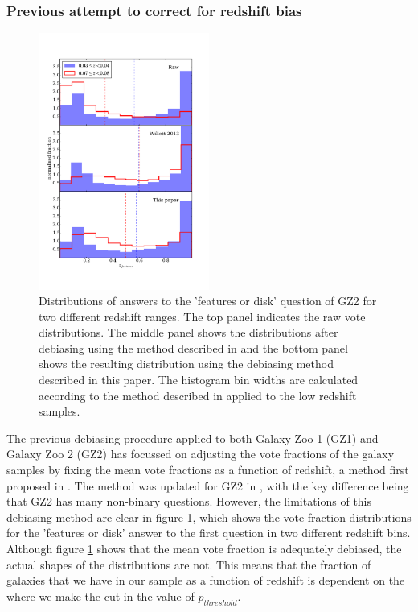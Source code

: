 \documentclass[useAMS,usenatbib]{mn2e}
\begin{document}
\subsubsection{Previous attempt to correct for redshift bias}
\label{sec:previous_method}
\begin{figure}
		\centering
		
        \includegraphics[width=0.5\textwidth]{Bias_imgs/vote_distribution_histograms.pdf}
		
        \caption{Distributions of answers to the 'features or disk' question of GZ2 for two different redshift ranges. The top panel indicates the raw vote distributions. The middle panel shows the distributions after debiasing using the method described in \citep{Willett_13} and the bottom panel shows the resulting distribution using the debiasing method described in this paper. The histogram bin widths are calculated according to the method described in \citet{Knuth_06} applied to the low redshift samples.}
		
        \label{fig:vote_histogram}
        
\end{figure}

The previous debiasing procedure applied to both Galaxy Zoo 1 (GZ1) and Galaxy Zoo 2 (GZ2) has focussed on adjusting the vote fractions of the galaxy samples by fixing the mean vote fractions as a function of redshift, a method first proposed in \citep{Bamford_09}. The method was updated for GZ2 in \citep{Willett_13}, with the key difference being that GZ2 has many non-binary questions. However, the limitations of this debiasing method are clear in figure \ref{fig:vote_histogram}, which shows the vote fraction distributions for the 'features or disk' answer to the first question in two different redshift bins. Although figure \ref{fig:vote_histogram} shows that the mean vote fraction is adequately debiased, the actual shapes of the distributions are not. This means that the fraction of galaxies that we have in our sample as a function of redshift is  dependent on the where we make the cut in the value of $p_{threshold}$. 
\end{document}
